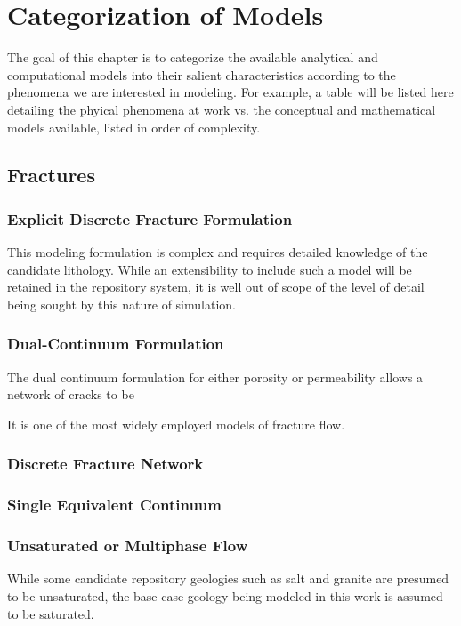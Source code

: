 \chapter{Categorization of Models}\label{ch:categorization}

The goal of this chapter is to categorize the available analytical and 
computational models into their salient characteristics according to the 
phenomena we are interested in modeling. For example, a table will be listed 
here detailing the phyical phenomena at work vs. the conceptual and 
mathematical models available, listed in order of complexity.



\section{Fractures}

\subsection{Explicit Discrete Fracture Formulation}

This modeling formulation is complex and requires detailed knowledge of the 
candidate lithology. While an extensibility to include such a model will be 
retained in the repository system, it is well out of scope of the level of 
detail being sought by this nature of simulation. 

\subsection{Dual-Continuum Formulation}

The dual continuum formulation for either porosity or permeability allows a 
network of cracks to be  

It is one of the most widely employed models of fracture flow. 
\cite{diodato_compendium_1994}

\subsection{Discrete Fracture Network}
\subsection{Single Equivalent Continuum}
\subsection{Unsaturated or Multiphase Flow}
While some candidate repository geologies such as salt and granite are presumed 
to be unsaturated, the base case geology being modeled in this work is assumed 
to be saturated.


